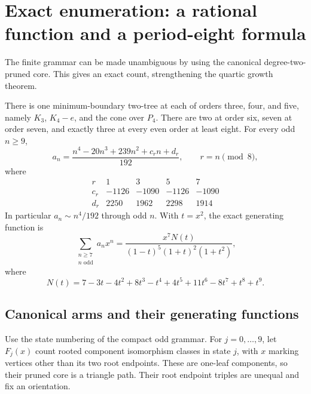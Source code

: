 \section{Exact enumeration: a rational function and a period-eight formula}
\label{sec:exact-odd-count}

The finite grammar can be made unambiguous by using the canonical
degree-two-pruned core.  This gives an exact count, strengthening the
quartic growth theorem.

\begin{theorem}
There is one minimum-boundary two-tree at each of orders three,
four, and five, namely $K_3$, $K_4-e$, and the cone over $P_4$.
There are two at order six, seven at order seven, and exactly three
at every even order at least eight.  For every odd $n\ge9$,
\[
 a_n=\frac{n^4-20n^3+239n^2+c_rn+d_r}{192},\qquad r=n\pmod8,
\]
where
\[
\begin{array}{c|rrrr}
r&1&3&5&7\\ \hline
c_r&-1126&-1090&-1126&-1090\\
d_r&2250&1962&2298&1914
\end{array}
\]
In particular $a_n\sim n^4/192$ through odd $n$.
With $t=x^2$, the exact generating function is
\begin{equation}
 \sum_{\substack{n\ge7\\n\text{ odd}}}a_nx^n
 =\frac{x^7N(t)}{(1-t)^5(1+t)^2(1+t^2)},
 \label{eq:exact-count-gf}
\end{equation}
where
\[
 N(t)=7-3t-4t^2+8t^3-t^4+4t^5+11t^6-8t^7+t^8+t^9.
\]
\end{theorem}

\subsection{Canonical arms and their generating functions}

Use the state numbering of the compact odd grammar.  For
$j=0,\ldots,9$, let $F_j(x)$ count rooted component isomorphism
classes in state $j$, with $x$ marking vertices other than its two
root endpoints.  These are one-leaf components, so their pruned
core is a triangle path.  Their root endpoint triples are unequal
and fix an orientation.

